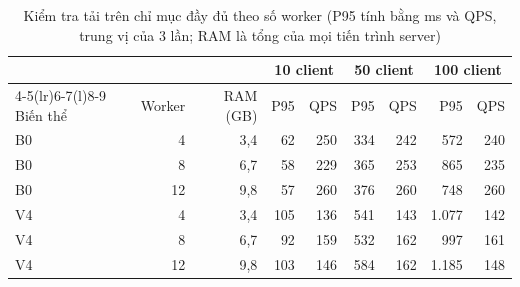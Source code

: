 \begin{table}[htbp]
\centering
\caption[Mở rộng dịch vụ theo số worker]{Kiểm tra tải trên chỉ mục đầy đủ theo số worker (P95 tính bằng ms và QPS, trung vị của 3 lần; RAM là tổng của mọi tiến trình server)}\label{tab:workers}
\begin{tabular}{@{}lrrrrrrrr@{}}
\toprule
& & & \multicolumn{2}{c}{10 client} & \multicolumn{2}{c}{50 client} & \multicolumn{2}{c}{100 client} \\
\cmidrule(lr){4-5}\cmidrule(lr){6-7}\cmidrule(l){8-9}
Biến thể & Worker & RAM (GB) & P95 & QPS & P95 & QPS & P95 & QPS \\
\midrule
B0 & 4 & 3,4 & 62 & 250 & 334 & 242 & 572 & 240 \\
B0 & 8 & 6,7 & 58 & 229 & 365 & 253 & 865 & 235 \\
B0 & 12 & 9,8 & 57 & 260 & 376 & 260 & 748 & 260 \\
\midrule
V4 & 4 & 3,4 & 105 & 136 & 541 & 143 & 1.077 & 142 \\
V4 & 8 & 6,7 & 92 & 159 & 532 & 162 & 997 & 161 \\
V4 & 12 & 9,8 & 103 & 146 & 584 & 162 & 1.185 & 148 \\
\bottomrule
\end{tabular}
\end{table}

